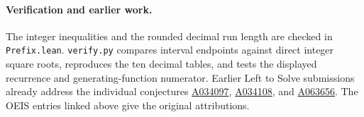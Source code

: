 \documentclass[11pt]{article}
\begin{document}
\paragraph{Verification and earlier work.} The integer inequalities and the rounded decimal run length are checked in \texttt{Prefix.lean}. \texttt{verify.py} compares interval endpoints against direct integer square roots, reproduces the ten decimal tables, and tests the displayed recurrence and generating-function numerator. Earlier Left to Solve submissions already address the individual conjectures \href{https://github.com/GuillaumeBAUD-coder/open-math-agents/pull/2504}{A034097}, \href{https://github.com/GuillaumeBAUD-coder/open-math-agents/pull/13440}{A034108}, and \href{https://github.com/GuillaumeBAUD-coder/open-math-agents/pull/14929}{A063656}. The OEIS entries linked above give the original attributions.
\end{document}
